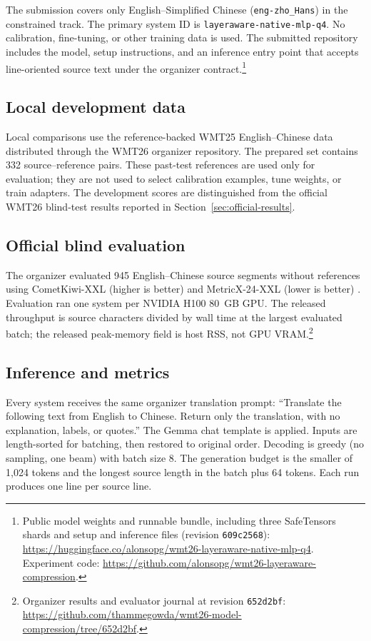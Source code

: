 \documentclass[11pt]{article}
\begin{document}
The submission covers only English--Simplified Chinese (\texttt{eng-zho\_Hans}) in the constrained track. The primary system ID is \texttt{layeraware-native-mlp-q4}. No calibration, fine-tuning, or other training data is used. The submitted repository includes the model, setup instructions, and an inference entry point that accepts line-oriented source text under the organizer contract.\footnote{Public model weights and runnable bundle, including three SafeTensors shards and setup and inference files (revision \texttt{609c2568}): \url{https://huggingface.co/alonsopg/wmt26-layeraware-native-mlp-q4}. Experiment code: \url{https://github.com/alonsopg/wmt26-layeraware-compression}.}

\subsection{Local development data}

Local comparisons use the reference-backed WMT25 English--Chinese data distributed through the WMT26 organizer repository. The prepared set contains 332 source--reference pairs. These past-test references are used only for evaluation; they are not used to select calibration examples, tune weights, or train adapters. The development scores are distinguished from the official WMT26 blind-test results reported in Section~\ref{sec:official-results}.

\subsection{Official blind evaluation}

The organizer evaluated 945 English--Chinese source segments without references using CometKiwi-XXL (higher is better) \citep{rei-etal-2023-scaling} and MetricX-24-XXL (lower is better) \citep{juraska-etal-2024-metricx}. Evaluation ran one system per NVIDIA H100 80~GB GPU. The released throughput is source characters divided by wall time at the largest evaluated batch; the released peak-memory field is host RSS, not GPU VRAM.\footnote{Organizer results and evaluator journal at revision \texttt{652d2bf}: \url{https://github.com/thammegowda/wmt26-model-compression/tree/652d2bf}.}

\subsection{Inference and metrics}

Every system receives the same organizer translation prompt: ``Translate the following text from English to Chinese. Return only the translation, with no explanation, labels, or quotes.'' The Gemma chat template is applied. Inputs are length-sorted for batching, then restored to original order. Decoding is greedy (no sampling, one beam) with batch size 8. The generation budget is the smaller of 1,024 tokens and the longest source length in the batch plus 64 tokens. Each run produces one line per source line.
\end{document}
